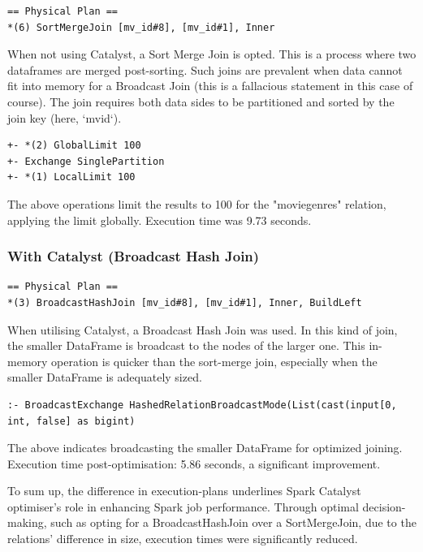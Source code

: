 \documentclass[12pt,twoside]{article}
\begin{document}
\begin{verbatim}
== Physical Plan ==
*(6) SortMergeJoin [mv_id#8], [mv_id#1], Inner
\end{verbatim}

When not using Catalyst, a Sort Merge Join is opted. This is a process where two dataframes are merged post-sorting. Such joins are prevalent when data cannot fit into memory for a Broadcast Join (this is a fallacious statement in this case of course). The join requires both data sides to be partitioned and sorted by the join key (here, `mv\textunderscore id`). 

\begin{verbatim}
+- *(2) GlobalLimit 100
+- Exchange SinglePartition
+- *(1) LocalLimit 100
\end{verbatim}

The above operations limit the results to 100 for the "movie\textunderscore genres" relation, applying the limit globally. Execution time was 9.73 seconds.

\subsubsection{With Catalyst (Broadcast Hash Join)}

\begin{verbatim}
== Physical Plan ==
*(3) BroadcastHashJoin [mv_id#8], [mv_id#1], Inner, BuildLeft
\end{verbatim}

When utilising Catalyst, a Broadcast Hash Join was used. In this kind of join, the smaller DataFrame is broadcast to the nodes of the larger one. This in-memory operation is quicker than the sort-merge join, especially when the smaller DataFrame is adequately sized.

\begin{verbatim}
:- BroadcastExchange HashedRelationBroadcastMode(List(cast(input[0, int, false] as bigint)
\end{verbatim}

The above indicates broadcasting the smaller DataFrame for optimized joining. Execution time post-optimisation: 5.86 seconds, a significant improvement.

To sum up, the difference in execution-plans underlines Spark Catalyst optimiser's role in enhancing Spark job performance. Through optimal decision-making, such as opting for a BroadcastHashJoin over a SortMergeJoin, due to the relations' difference in size, execution times were significantly reduced.
\end{document}
